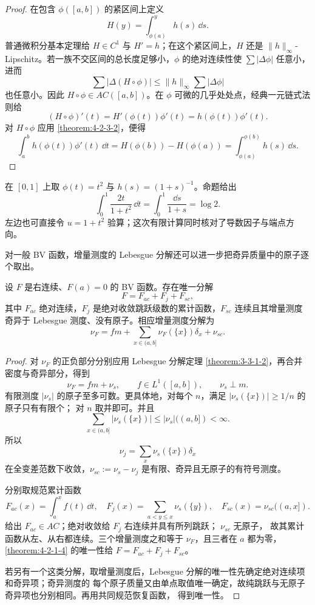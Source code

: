 \begin{proof}
在包含 $\phi([a,b])$ 的紧区间上定义
\[
 H(y)=\int_{\phi(a)}^y h(s)\,\dd s.
\]
普通微积分基本定理给 $H\in C^1$ 与 $H'=h$；在这个紧区间上，$H$ 还是
$\|h\|_\infty$-Lipschitz。若一族不交区间的总长度足够小，$\phi$ 的绝对连续性使
$\sum|\Delta\phi|$ 任意小，进而
\[
 \sum|\Delta(H\circ\phi)|
 \le\|h\|_\infty\sum|\Delta\phi|
\]
也任意小。因此 $H\circ\phi\in AC([a,b])$。在 $\phi$ 可微的几乎处处点，经典一元链式法则给
\[
 (H\circ\phi)'(t)=H'(\phi(t))\phi'(t)
 =h(\phi(t))\phi'(t).
\]
对 $H\circ\phi$ 应用 \cref{theorem:4-2-3-2}，便得
\[
 \int_a^b h(\phi(t))\phi'(t)\,\dd t
 =H(\phi(b))-H(\phi(a))
 =\int_{\phi(a)}^{\phi(b)}h(s)\,\dd s.
\]
\end{proof}

\begin{example}[平方参数换元]
在 $[0,1]$ 上取 $\phi(t)=t^2$ 与 $h(s)=(1+s)^{-1}$。命题给出
\[
 \int_0^1\frac{2t}{1+t^2}\,\dd t
 =\int_0^1\frac{\dd s}{1+s}=\log2.
\]
左边也可直接令 $u=1+t^2$ 验算；这次有限计算同时核对了导数因子与端点方向。
\end{example}

对一般 BV 函数，增量测度的 Lebesgue 分解还可以进一步把奇异质量中的原子逐个取出。

\begin{theorem}[BV 的三部分分解]\label{theorem:4-2-3-3}
设 $F$ 是右连续、$F(a)=0$ 的 BV 函数。存在唯一分解
\[
 F=F_{ac}+F_j+F_{sc},
\]
其中 $F_{ac}$ 绝对连续，$F_j$ 是绝对收敛跳跃级数的累计函数，$F_{sc}$ 连续且其增量测度
奇异于 Lebesgue 测度、没有原子。相应增量测度分解为
\[
 \nu_F=fm+\sum_{x\in(a,b]}\nu_F(\{x\})\delta_x+\nu_{sc}.
\]
\end{theorem}

\begin{proof}
对 $\nu_F$ 的正负部分分别应用 Lebesgue 分解定理
\cref{theorem:3-3-1-2}，再合并密度与奇异部分，得到
\[
 \nu_F=fm+\nu_s,\qquad f\in L^1([a,b]),\qquad \nu_s\perp m.
\]
有限测度 $|\nu_s|$ 的原子至多可数。更具体地，对每个 $n$，满足
$|\nu_s(\{x\})|\geq1/n$ 的原子只有有限个；
对 $n$ 取并即可。并且
\[
 \sum_{x\in(a,b]}|\nu_s(\{x\})|
 \le |\nu_s|((a,b])<\infty.
\]
所以
\[
 \nu_j=\sum_x\nu_s(\{x\})\delta_x
\]
在全变差范数下收敛，$\nu_{sc}:=\nu_s-\nu_j$ 是有限、奇异且无原子的有符号测度。

分别取规范累计函数
\[
 F_{ac}(x)=\int_a^xf(t)\,\dd t,
 \quad
 F_j(x)=\sum_{a<y\le x}\nu_s(\{y\}),
 \quad
 F_{sc}(x)=\nu_{sc}((a,x]).
\]
 给出 $F_{ac}\in AC$；绝对收敛给 $F_j$ 右连续并具有所列跳跃；
$\nu_{sc}$ 无原子，
故其累计函数从左、从右都连续。三个增量测度之和等于 $\nu_F$，且三者在 $a$ 都为零，
\cref{theorem:4-2-1-4} 的唯一性给 $F=F_{ac}+F_j+F_{sc}$。

若另有一个这类分解，取增量测度后，Lebesgue 分解的唯一性先确定绝对连续项和奇异项；奇异测度的
每个原子质量又由单点取值唯一确定，故纯跳跃与无原子奇异项也分别相同。再用共同规范恢复函数，
得到唯一性。
\end{proof}

